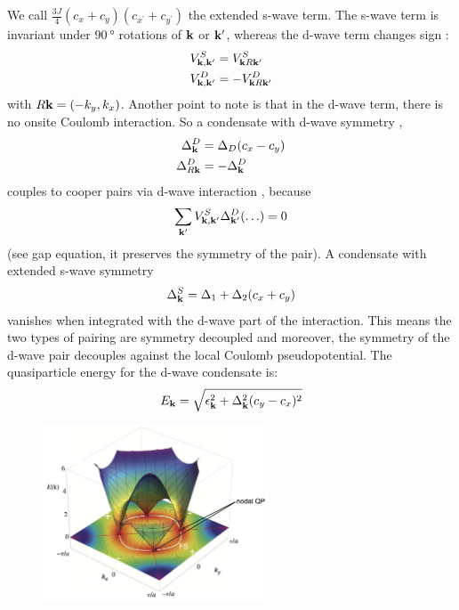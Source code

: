 We call \(\frac{3 J}{4} (c_x  + c_y)(c_{x^{\prime}} + c_{y^{\prime}})\) the extended s-wave term.
The s-wave term is invariant under \(\SI{90}{\degree}\) rotations of \(\mathbf{k}\) or \(\mathbf{k}^{\prime}\), whereas the d-wave term changes sign :
\begin{align}
    V_{\mathbf{k}, \mathbf{k}^{\prime}}^S &= V_{\mathbf{k} R\mathbf{k}^{\prime}}^S \\
    V_{\mathbf{k}, \mathbf{k}^{\prime}}^D &= -V_{\mathbf{k} R\mathbf{k}^{\prime}}^D
\end{align}
with \(R\mathbf{k} = (-k_y, k_x)\).
Another point to note is that in the d-wave term, there is no onsite Coulomb interaction.
So a condensate with d-wave symmetry ,
\begin{align}
    \Delta_{\mathbf{k}}^D &= \Delta_D (c_x - c_y) \\
    \Delta_{R\mathbf{k}}^D &= -\Delta_{\mathbf{k}}^D
\end{align}
couples to cooper pairs via d-wave interaction , because
\begin{equation}
    \sum_{\mathbf{k}^{\prime}} V_{\mathbf{k}, \mathbf{k}^{\prime}}^S \Delta_{\mathbf{k}^{\prime}}^D (\ldots) = 0
\end{equation}
(see gap equation, it preserves the symmetry of the pair).
A condensate with extended s-wave symmetry
\begin{equation}
    \Delta_{\mathbf{k}}^S = \Delta_1 + \Delta_2 (c_x + c_y)
\end{equation}
vanishes when integrated with the d-wave part of the interaction.
This means the two types of pairing are symmetry decoupled and moreover, the symmetry of the d-wave pair decouples against the local Coulomb pseudopotential.
The quasiparticle  energy for the d-wave condensate is:
\begin{equation}
    E_{\mathbf{k}} = \sqrt{\epsilon_{\mathbf{k}}^2 + \Delta_{\mathbf{k}}^2 (c_y - c_x)^2}
\end{equation}
\begin{figure}[ht]
    \centering
    \includegraphics[width=0.6\textwidth]{notes/images/energy dispersion d-wave}
    \caption{}
    \label{fig:d-wave dispersion}
\end{figure}
